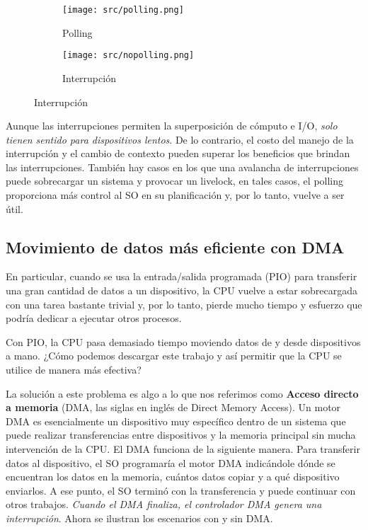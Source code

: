 \documentclass[openany]{book}
\begin{document}
\begin{figure}[h]
    \centering
    \begin{subfigure}[b]{0.47\textwidth}
        \texttt{[image: src/polling.png]}
        \caption{Polling}
    \end{subfigure}
    \begin{subfigure}[b]{0.47\textwidth}
        \texttt{[image: src/nopolling.png]}
        \caption{Interrupción}
    \end{subfigure}
\end{figure}

Aunque las interrupciones permiten la superposición de cómputo e I/O, \textit{solo tienen sentido para dispositivos lentos}. De lo contrario, el \colorbox{yellow!20}{costo del manejo de la interrupción y el cambio de contexto} pueden superar los beneficios que brindan las interrupciones. También hay casos en los que una \colorbox{yellow!20}{avalancha de interrupciones} puede sobrecargar un sistema y provocar un livelock, en tales casos, el polling proporciona más control al SO en su planificación y, por lo tanto, vuelve a ser útil.

\subsection{Movimiento de datos más eficiente con DMA}

En particular, cuando se usa la entrada/salida programada (PIO) para transferir una gran cantidad de datos a un dispositivo, la CPU vuelve a estar sobrecargada con una tarea bastante trivial y, por lo tanto, pierde mucho tiempo y esfuerzo que podría dedicar a ejecutar otros procesos. 

Con PIO, la CPU pasa demasiado tiempo moviendo datos de y desde dispositivos a mano. ¿Cómo podemos descargar este trabajo y así permitir que la CPU se utilice de manera más efectiva?

La solución a este problema es algo a lo que nos referimos como \textbf{Acceso directo a memoria} (DMA, las siglas en inglés de Direct Memory Access). Un motor DMA es esencialmente un dispositivo muy específico dentro de un sistema que puede realizar transferencias entre dispositivos y la memoria principal sin mucha intervención de la CPU.
El DMA funciona de la siguiente manera. Para transferir datos al dispositivo, el SO programaría el motor DMA indicándole \colorbox{yellow!20}{dónde} se encuentran los datos en la memoria, \colorbox{yellow!20}{cuántos} datos copiar y \colorbox{yellow!20}{a qué dispositivo enviarlos}. A ese punto, el SO terminó con la transferencia y \colorbox{yellow!20}{puede continuar con otros trabajos}. \textit{Cuando el DMA finaliza, el controlador DMA genera una interrupción}. Ahora se ilustran los escenarios con y sin DMA.
\end{document}
